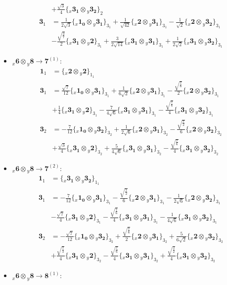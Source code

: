 \documentclass[english]{article}
\newcommand{\rep}[1]{\mathbf{#1}}
\newcommand{\repx}[2]{{}_{#2}\mathbf{#1}}
\newcommand{\tsprodx}[2]{\repx{#1}{x}\otimes\repx{#2}{y}}
\newcommand{\subcgs}[3]{\big\{ \tsprodx{#1}{#2}\big\}^{}_{#3}}
\begin{document}
\begin{itemize}
\begin{align*}
 & +\frac{\sqrt{3}}{4}\subcgs{3_{1}}{3_{2}}{2}
\\
\rep{3}_{1} & = \frac{1}{2 \sqrt{3}}\subcgs{1_{0}}{3_{1}}{3_{1}}+\frac{1}{\sqrt{42}}\subcgs{2}{3_{1}}{3_{1}}-\frac{1}{\sqrt{2}}\subcgs{2}{3_{2}}{3_{1}} \\ 
 & -\frac{\sqrt{\frac{3}{7}}}{2}\subcgs{3_{1}}{2}{3_{1}}+\frac{3}{2 \sqrt{14}}\subcgs{3_{1}}{3_{1}}{3_{1}}+\frac{1}{2 \sqrt{2}}\subcgs{3_{1}}{3_{2}}{3_{1}}
\end{align*}
\item $\tsprodx{6}{8}\to\rep{7}^{(1)}$:
\begin{align*}
\rep{1}_{1} & = \subcgs{2}{2}{1_{1}}
\\
\rep{3}_{1} & = \frac{\sqrt{7}}{12}\subcgs{1_{0}}{3_{1}}{3_{1}}+\frac{1}{6 \sqrt{2}}\subcgs{2}{3_{1}}{3_{1}}-\frac{\sqrt{\frac{7}{6}}}{2}\subcgs{2}{3_{2}}{3_{1}} \\ 
 & +\frac{1}{4}\subcgs{3_{1}}{2}{3_{1}}-\frac{7}{4 \sqrt{6}}\subcgs{3_{1}}{3_{1}}{3_{1}}-\frac{\sqrt{\frac{7}{6}}}{4}\subcgs{3_{1}}{3_{2}}{3_{1}}
\\
\rep{3}_{2} & = -\frac{7}{12}\subcgs{1_{0}}{3_{2}}{3_{2}}+\frac{1}{2 \sqrt{6}}\subcgs{2}{3_{1}}{3_{2}}-\frac{\sqrt{\frac{7}{2}}}{6}\subcgs{2}{3_{2}}{3_{2}} \\ 
 & +\frac{\sqrt{3}}{4}\subcgs{3_{1}}{2}{3_{2}}+\frac{5}{4 \sqrt{6}}\subcgs{3_{1}}{3_{1}}{3_{2}}-\frac{\sqrt{\frac{7}{6}}}{4}\subcgs{3_{1}}{3_{2}}{3_{2}}
\end{align*}
\item $\tsprodx{6}{8}\to\rep{7}^{(2)}$:
\begin{align*}
\rep{1}_{1} & = \subcgs{3_{1}}{3_{2}}{1_{1}}
\\
\rep{3}_{1} & = -\frac{7}{12}\subcgs{1_{0}}{3_{1}}{3_{1}}-\frac{\sqrt{\frac{7}{2}}}{6}\subcgs{2}{3_{1}}{3_{1}}-\frac{1}{2 \sqrt{6}}\subcgs{2}{3_{2}}{3_{1}} \\ 
 & -\frac{\sqrt{7}}{4}\subcgs{3_{1}}{2}{3_{1}}-\frac{\sqrt{\frac{7}{6}}}{4}\subcgs{3_{1}}{3_{1}}{3_{1}}-\frac{1}{4 \sqrt{6}}\subcgs{3_{1}}{3_{2}}{3_{1}}
\\
\rep{3}_{2} & = -\frac{\sqrt{7}}{12}\subcgs{1_{0}}{3_{2}}{3_{2}}+\frac{\sqrt{\frac{7}{6}}}{2}\subcgs{2}{3_{1}}{3_{2}}+\frac{5}{6 \sqrt{2}}\subcgs{2}{3_{2}}{3_{2}} \\ 
 & +\frac{\sqrt{\frac{7}{3}}}{4}\subcgs{3_{1}}{2}{3_{2}}-\frac{\sqrt{\frac{7}{6}}}{4}\subcgs{3_{1}}{3_{1}}{3_{2}}+\frac{\sqrt{\frac{3}{2}}}{4}\subcgs{3_{1}}{3_{2}}{3_{2}}
\end{align*}
\item $\tsprodx{6}{8}\to\rep{8}^{(1)}$:

\end{itemize}
\end{document}
